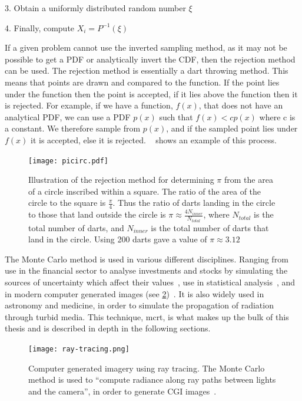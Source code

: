 3. Obtain a uniformly distributed random number $\xi$

4. Finally, compute $X_i = P^{-1}(\xi)$

\medskip

If a given problem cannot use the inverted sampling method, as it may not be possible to get a PDF or analytically invert the CDF, then the rejection method can be used.
The rejection method is essentially a dart throwing method.
This means that points are drawn and compared to the function.
If the point lies under the function then the point is accepted, if it lies above the function then it is rejected.
For example, if we have a function, $f(x)$, that does not have an analytical PDF, we can use a PDF $p(x)$ such that $f(x) < cp(x)$ where c is a constant.
We therefore sample from $p(x)$, and if the sampled point lies under $f(x)$ it is accepted, else it is rejected.
~ shows an example of this process.

\begin{figure}[!ht]
	\centering
	\texttt{[image: picirc.pdf]}
	\caption{Illustration of the rejection method for determining $\pi$ from the area of a circle inscribed within a square. The ratio of the area of the circle to the square is $\tfrac{\pi}{4}$. Thus the ratio of darts landing in the circle to those that land outside the circle is $\pi \approx \tfrac{4N_{inner}}{N_{total}}$, where $N_{total}$ is the total number of darts, and $N_{inner}$ is the total number of darts that land in the circle. Using 200 darts gave a value of $\pi \approx 3.12$}
	\label{fig:picircle}
\end{figure}


The Monte Carlo method is used in various different disciplines. Ranging from use in the financial sector to analyse investments and stocks by simulating the sources of uncertainty which affect their values~\cite{jackel2002monte,finaceprrof}, use in statistical analysis~\cite{wall2012practical}, and in modern computer generated images (see \cref{fig:ray-trace})~\cite{Kajiyarendering,Cookraytracing}. It is also widely used in astronomy and medicine, in order to simulate the propagation of radiation through turbid media. This technique, \gls*{mcrt}, is what makes up the bulk of this thesis and is described in depth in the following sections.

\begin{figure}[!htb]
\centering
\texttt{[image: ray-tracing.png]}
\caption{Computer generated imagery using ray tracing. The Monte Carlo method is used to ``compute radiance along ray paths between lights and the camera'', in order to generate CGI images~\cite{pharr2016physically}.}
\label{fig:ray-trace}
\end{figure}
\newpage
